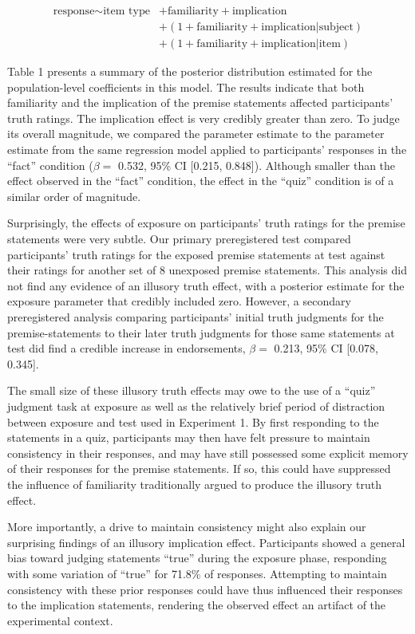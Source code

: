 \documentclass[10pt, letterpaper]{article}
\begin{document}
\begin{align*}
\text{response} \sim 
 \text{item type} &+ \text{familiarity} + \text{implication} \\
&+ (1 + \text{familiarity} + \text{implication}|\text{subject}) \\
&+ (1 + \text{familiarity} + \text{implication}|\text{item})
\end{align*}

Table 1 presents a summary of the posterior distribution estimated for
the population-level coefficients in this model. The results indicate
that both familiarity and the implication of the premise statements
affected participants' truth ratings. The implication effect is very
credibly greater than zero. To judge its overall magnitude, we compared
the parameter estimate to the parameter estimate from the same
regression model applied to participants' responses in the ``fact''
condition (\(\beta =\) 0.532, 95\% CI {[}0.215, 0.848{]}). Although
smaller than the effect observed in the ``fact'' condition, the effect
in the ``quiz'' condition is of a similar order of magnitude.

Surprisingly, the effects of exposure on participants' truth ratings for
the premise statements were very subtle. Our primary preregistered test
compared participants' truth ratings for the exposed premise statements
at test against their ratings for another set of 8 unexposed premise
statements. This analysis did not find any evidence of an illusory truth
effect, with a posterior estimate for the exposure parameter that
credibly included zero. However, a secondary preregistered analysis
comparing participants' initial truth judgments for the
premise-statements to their later truth judgments for those same
statements at test did find a credible increase in endorsements,
\(\beta =\) 0.213, 95\% CI {[}0.078, 0.345{]}.

The small size of these illusory truth effects may owe to the use of a
``quiz'' judgment task at exposure as well as the relatively brief
period of distraction between exposure and test used in Experiment 1. By
first responding to the statements in a quiz, participants may then have
felt pressure to maintain consistency in their responses, and may have
still possessed some explicit memory of their responses for the premise
statements. If so, this could have suppressed the influence of
familiarity traditionally argued to produce the illusory truth effect.

More importantly, a drive to maintain consistency might also explain our
surprising findings of an illusory implication effect. Participants
showed a general bias toward judging statements ``true'' during the
exposure phase, responding with some variation of ``true'' for 71.8\% of
responses. Attempting to maintain consistency with these prior responses
could have thus influenced their responses to the implication
statements, rendering the observed effect an artifact of the
experimental context.
\end{document}
